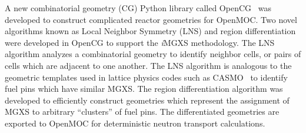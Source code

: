 \documentclass[12pt,twoside]{mitthesis-exec}
\begin{document}
A new combinatorial geometry (CG) Python library called OpenCG~\cite{boyd2015opencg} was developed to construct complicated reactor geometries for OpenMOC. Two novel algorithms known as Local Neighbor Symmetry (LNS) and region differentiation were developed in OpenCG to support the \textit{i}MGXS methodology. The LNS algorithm analyzes a combinatorial geometry to identify neighbor cells, or pairs of cells which are adjacent to one another. The LNS algorithm is analogous to the geometric templates used in lattice physics codes such as CASMO~\cite{edenius1995casmo} to identify fuel pins which have similar MGXS. The region differentiation algorithm was developed to efficiently construct geometries which represent the assignment of MGXS to arbitrary ``clusters'' of fuel pins. The differentiated geometries are exported to OpenMOC for deterministic neutron transport calculations. 



%
%
%
%
%
%
\end{document}
